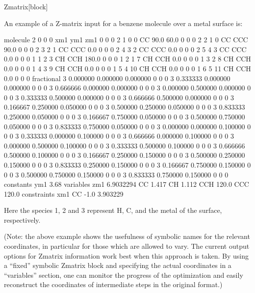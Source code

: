 \begin{fdfentry}{Zmatrix}[block]
\begin{fdfoptions}
  \end{fdfoptions}
  
  An example of a Z-matrix input for a benzene molecule over a metal surface is:
  \begin{fdfexample}
      molecule
       2 0 0 0 xm1 ym1 zm1 0 0 0
       2 1 0 0 CC 90.0 60.0 0 0 0
       2 2 1 0 CC CCC 90.0 0 0 0
       2 3 2 1 CC CCC 0.0 0 0 0
       2 4 3 2 CC CCC 0.0 0 0 0
       2 5 4 3 CC CCC 0.0 0 0 0
       1 1 2 3 CH CCH 180.0 0 0 0
       1 2 1 7 CH CCH 0.0 0 0 0
       1 3 2 8 CH CCH 0.0 0 0 0
       1 4 3 9 CH CCH 0.0 0 0 0
       1 5 4 10 CH CCH 0.0 0 0 0
       1 6 5 11 CH CCH 0.0 0 0 0
      fractional
       3 0.000000 0.000000 0.000000 0 0 0
       3 0.333333 0.000000 0.000000 0 0 0
       3 0.666666 0.000000 0.000000 0 0 0
       3 0.000000 0.500000 0.000000 0 0 0
       3 0.333333 0.500000 0.000000 0 0 0
       3 0.666666 0.500000 0.000000 0 0 0
       3 0.166667 0.250000 0.050000 0 0 0
       3 0.500000 0.250000 0.050000 0 0 0
       3 0.833333 0.250000 0.050000 0 0 0
       3 0.166667 0.750000 0.050000 0 0 0
       3 0.500000 0.750000 0.050000 0 0 0
       3 0.833333 0.750000 0.050000 0 0 0
       3 0.000000 0.000000 0.100000 0 0 0
       3 0.333333 0.000000 0.100000 0 0 0
       3 0.666666 0.000000 0.100000 0 0 0
       3 0.000000 0.500000 0.100000 0 0 0
       3 0.333333 0.500000 0.100000 0 0 0
       3 0.666666 0.500000 0.100000 0 0 0
       3 0.166667 0.250000 0.150000 0 0 0
       3 0.500000 0.250000 0.150000 0 0 0
       3 0.833333 0.250000 0.150000 0 0 0
       3 0.166667 0.750000 0.150000 0 0 0
       3 0.500000 0.750000 0.150000 0 0 0
       3 0.833333 0.750000 0.150000 0 0 0
     constants
       ym1 3.68
     variables
       zm1 6.9032294
       CC 1.417
       CH 1.112
       CCH 120.0
       CCC 120.0
     constraints
       xm1 CC -1.0 3.903229
  \end{fdfexample}
  
  Here the species 1, 2 and 3 represent H, C, and the metal of the
  surface, respectively.
   
  (Note: the above example shows the usefulness of symbolic names
  for the relevant coordinates, in particular for those which are
  allowed to vary. The current output options for Zmatrix information
  work best when this approach is taken. By using a ``fixed'' symbolic
  Zmatrix block and specifying the actual coordinates in a ``variables''
  section, one can monitor the progress of the optimization and
  easily reconstruct the coordinates of intermediate steps in the
  original format.)

\end{fdfentry}

